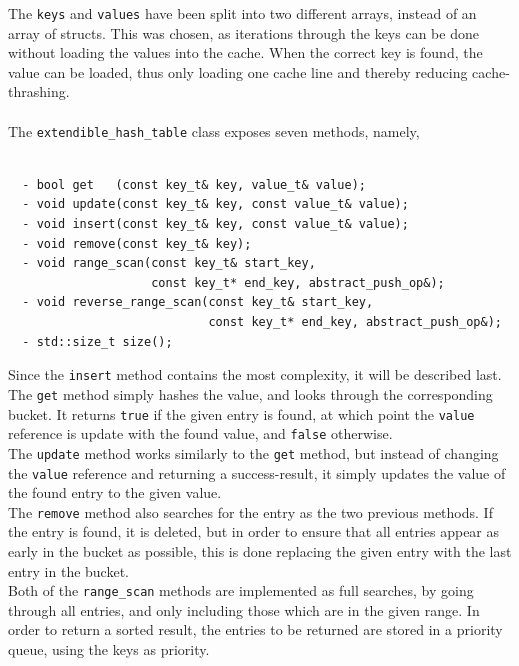 \documentclass[11pt]{article} %
\begin{document}
The \verb|keys| and \verb|values| have been split into two different arrays, instead of an array of structs. This was chosen, as iterations through the keys can be done without loading the values into the cache. When the correct key is found, the value can be loaded, thus only loading one cache line and thereby reducing cache-thrashing.\\
\\
The \verb|extendible_hash_table| class exposes seven methods, namely,
\begin{lstlisting}[frame=single]  % Start your code-block

  - bool get   (const key_t& key, value_t& value);
  - void update(const key_t& key, const value_t& value);
  - void insert(const key_t& key, const value_t& value);
  - void remove(const key_t& key);
  - void range_scan(const key_t& start_key,
                    const key_t* end_key, abstract_push_op&);
  - void reverse_range_scan(const key_t& start_key,
                            const key_t* end_key, abstract_push_op&);
  - std::size_t size();
\end{lstlisting}
Since the \verb|insert| method contains the most complexity, it will be described last. \\

The \verb|get| method simply hashes the value, and looks through the corresponding bucket. It returns \verb|true| if the given entry is found, at which point the \verb|value| reference is update with the found value, and \verb|false| otherwise.\\

The \verb|update| method works similarly to the \verb|get| method, but instead of changing the \verb|value| reference and returning a success-result, it simply updates the value of the found entry to the given value.\\

The \verb|remove| method also searches for the entry as the two previous methods. If the entry is found, it is deleted, but in order to ensure that all entries appear as early in the bucket as possible, this is done replacing the given entry with the last entry in the bucket. \\

Both of the \verb|range_scan| methods are implemented as full searches, by going through all entries, and only including those which are in the given range. In order to return a sorted result, the entries to be returned are stored in a priority queue, using the keys as priority. 
\end{document}
